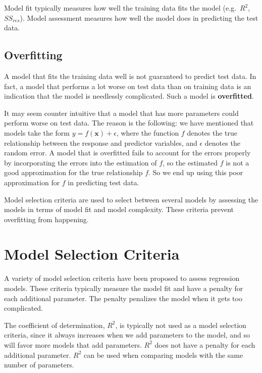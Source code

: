 \documentclass[
]{book}
\begin{document}
Model fit typically measures how well the training data fits the model (e.g.~\(R^2\), \(SS_{res}\)). Model assessment measures how well the model does in predicting the test data.

\hypertarget{overfitting}{%
\subsection{Overfitting}\label{overfitting}}

A model that fits the training data well is not guaranteed to predict test data. In fact, a model that performs a lot worse on test data than on training data is an indication that the model is needlessly complicated. Such a model is \textbf{overfitted}.

It may seem counter intuitive that a model that has more parameters could perform worse on test data. The reason is the following: we have mentioned that models take the form \(y = f(\boldsymbol{x}) + \epsilon\), where the function \(f\) denotes the true relationship between the response and predictor variables, and \(\epsilon\) denotes the random error. A model that is overfitted fails to account for the errors properly by incorporating the errors into the estimation of \(f\), so the estimated \(f\) is not a good approximation for the true relationship \(f\). So we end up using this poor approximation for \(f\) in predicting test data.

Model selection criteria are used to select between several models by assessing the models in terms of model fit and model complexity. These criteria prevent overfitting from happening.

\hypertarget{model-selection-criteria}{%
\section{Model Selection Criteria}\label{model-selection-criteria}}

A variety of model selection criteria have been proposed to assess regression models. These criteria typically measure the model fit and have a penalty for each additional parameter. The penalty penalizes the model when it gets too complicated.

The coefficient of determination, \(R^2\), is typically not used as a model selection criteria, since it always increases when we add parameters to the model, and so will favor more models that add parameters. \(R^2\) does not have a penalty for each additional parameter. \(R^2\) can be used when comparing models with the same number of parameters.
\end{document}
